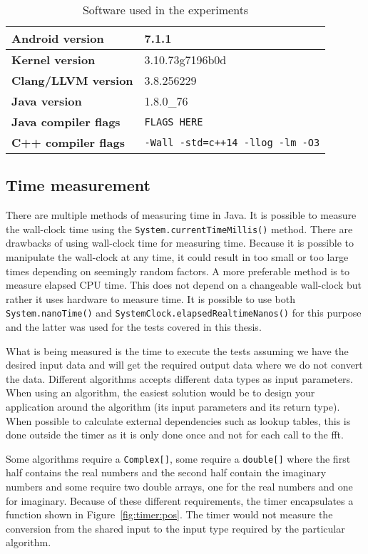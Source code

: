 \ifrelease
\begin{table}[H]
    \centering
    \caption{Software used in the experiments}
    \begin{tabular}{|l|l|}
        \hline
        \textbf{Android version} & 7.1.1\\
        \hline
        \textbf{Kernel version} & 3.10.73g7196b0d\\
        \hline
        \textbf{Clang/LLVM version} & 3.8.256229\\
        \hline
        \textbf{Java version} & 1.8.0\_76\\
        \hline
        \textbf{Java compiler flags} & \texttt{FLAGS HERE}\\
        \hline
        \textbf{C++ compiler flags} & \texttt{-Wall -std=c++14 -llog -lm -O3}\\
        \hline
    \end{tabular}
    \label{tab:software}
\end{table}
\fi

\subsection{Time measurement}
There are multiple methods of measuring time in Java. It is possible to measure the wall-clock time using the \texttt{System.currentTimeMillis()} method. There are drawbacks of using wall-clock time for measuring time. Because it is possible to manipulate the wall-clock at any time, it could result in too small or too large times depending on seemingly random factors. A more preferable method is to measure elapsed CPU time. This does not depend on a changeable wall-clock but rather it uses hardware to measure time. It is possible to use both \texttt{System.nanoTime()} and \texttt{SystemClock.elapsedRealtimeNanos()} for this purpose and the latter was used for the tests covered in this thesis.

What is being measured is the time to execute the tests assuming we have the desired input data and will get the required output data where we do not convert the data. Different algorithms accepts different data types as input parameters. When using an algorithm, the easiest solution would be to design your application around the algorithm (its input parameters and its return type). When possible to calculate external dependencies such as lookup tables, this is done outside the timer as it is only done once and not for each call to the \gls{fft}.

Some algorithms require a \texttt{Complex[]}, some require a \texttt{double[]} where the first half contains the real numbers and the second half contain the imaginary numbers and some require two double arrays, one for the real numbers and one for imaginary. Because of these different requirements, the timer encapsulates a function shown in Figure~\ref{fig:timer:pos}. The timer would not measure the conversion from the shared input to the input type required by the particular algorithm.

